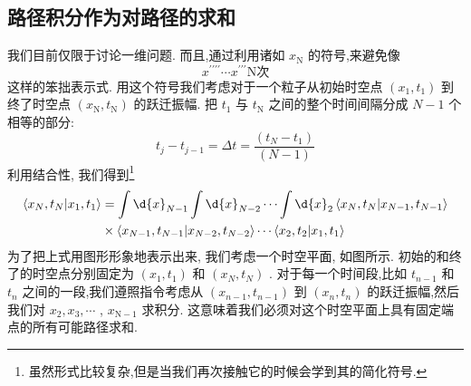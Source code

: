 \documentclass[lang=cn,newtx,10pt,scheme=chinese,thmcnt=section]{elegantbook}
\begin{document}
\subsection*{路径积分作为对路径的求和}
我们目前仅限于讨论一维问题. 而且,通过利用诸如 ${x}_{\mathrm{N}}$ 的符号,来避免像
\begin{equation}
	{x}^{\prime \prime \prime \prime }\cdots {x}^{\prime \prime \prime }\text{N次}
\end{equation}
这样的笨拙表示式. 用这个符号我们考虑对于一个粒子从初始时空点 $\left( {{x}_{1},{t}_{1}}\right)$ 到终了时空点 $\left( {{x}_{\mathrm{N}},{t}_{\mathrm{N}}}\right)$ 的跃迁振幅. 把 ${t}_{1}$ 与 ${t}_{\mathrm{N}}$ 之间的整个时间间隔分成 $N - 1$ 个相等的部分:
\begin{equation}
	{t}_{j} - {t}_{j - 1} = {\Delta t} = \frac{\left( {t}_{N} - {t}_{1}\right) }{\left( N - 1\right) }
\end{equation}
利用结合性, 我们得到\footnote{虽然形式比较复杂,但是当我们再次接触它的时候会学到其的简化符号.}
\begin{equation}
	\begin{aligned}
		\left\langle {{x}_{N},{t}_{N} | {x}_{1},{t}_{1}}\right\rangle &= \int \d{x}_{N - 1}\int \d{x}_{N - 2}\cdots \int \d{x}_{2}\left\langle {{x}_{N},{t}_{N} | {x}_{N - 1},{t}_{N - 1}}\right\rangle\\
		&\times \left\langle {{x}_{N - 1},{t}_{N - 1} | {x}_{N - 2},{t}_{N - 2}}\right\rangle \cdots \left\langle {{x}_{2},{t}_{2} | {x}_{1},{t}_{1}}\right\rangle
	\end{aligned}
\end{equation}
为了把上式用图形形象地表示出来, 我们考虑一个时空平面, 如图所示. 初始的和终了的时空点分别固定为 $\left( {{x}_{1},{t}_{1}}\right)$ 和 $\left( {{x}_{N},{t}_{N}}\right)$ . 对于每一个时间段,比如 ${t}_{n - 1}$ 和 ${t}_{n}$ 之间的一段,我们遵照指令考虑从 $\left( {{x}_{n - 1},{t}_{n - 1}}\right)$ 到 $\left( {{x}_{n},{t}_{n}}\right)$ 的跃迁振幅,然后我们对 ${x}_{2},{x}_{3},\cdots$ , ${x}_{\mathrm{N} - 1}$ 求积分. 这意味着我们必须对这个时空平面上具有固定端点的所有可能路径求和.
\end{document}
